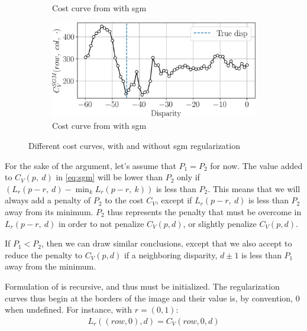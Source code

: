 \begin{figure}
\begin{subfigure}[t]{0.49\linewidth}
        \caption{Cost curve from  with \acrshort{sgm}}
        \label{fig:cost_curve_sgm_row_100_col_250}
    \end{subfigure}\hfill
    \begin{subfigure}[t]{0.49\linewidth}
        \flushright
        \includegraphics[width=\linewidth]{Images/Chap_1/cost_curve_sgm_row_276_col_360.png}
        \caption{Cost curve from  with \acrshort{sgm}}
        \label{fig:cost_curve_sgm_row_276_col_360}
    \end{subfigure}
    \caption{Different cost curves, with and without \acrshort{sgm} regularization}
    \label{fig:cost_curve_with_without_sgm}
\end{figure}

\begin{remark}
    For the sake of the argument, let's assume that $P_1=P_2$ for now. The value added to $C_V(p, ~d)$ in \eqref{eq:sgm} will be lower than $P_2$ only if $(L_r(p-r,~d) - \min_k L_r(p-r,~k))$ is less than $P_2$. This means that we will always add a penalty of $P_2$ to the cost $C_V$, except if $L_r(p-r,~d)$ is less than $P_2$ away from its minimum. $P_2$ thus represents the penalty that must be overcome in $L_r(p-r,~d)$ in order to not penalize $C_V(p,d)$, or slightly penalize $C_V(p,d)$.
    
    If $P_1<P_2$, then we can draw similar conclusions, except that we also accept to reduce the penalty to $C_V(p,d)$ if a neighboring disparity, \ie $d\pm1$ is less than $P_1$ away from the minimum.
\end{remark}

Formulation of  is recursive, and thus must be initialized. The regularization curves thus begin at the borders of the image and their value is, by convention, $0$ when undefined. For instance, with $r=(0,1)$:
\begin{align*}
    L_r((row, 0),d) = C_V(row, 0 ,d)
\end{align*} 

